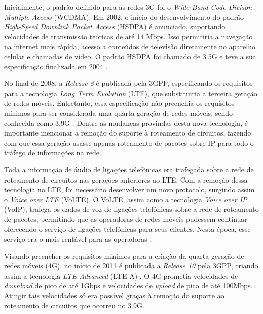 Inicialmente, o padrão definido para as redes 3G foi o \textit{Wide-Band Code-Divison Multiple Access} (WCDMA).
Em 2002, o início do desenvolvimento do padrão \textit{High-Speed Downlink Packet Access} (HSDPA) é anunciado, suportando velocidades de transmissão teóricas de até 14 Mbps. Isso permitiria a navegação na internet mais rápida, acesso a conteúdos de televisão diretamente no aparelho celular e chamadas de vídeo. O padrão HSDPA foi chamado de 3.5G e teve a sua especificação finalizada em 2004 \cite{Lamba2012}.

No final de 2008, a \textit{Release 8} é publicada pela 3GPP, especificando os requisitos para a tecnologia \textit{Long Term Evolution} (LTE), que substituiria a terceira geração de redes móveis.
Entretanto, essa especificação não preenchia os requisitos mínimos para ser considerada uma quarta geração de redes móveis, sendo conhecida como 3.9G \cite{delperal2018}.
Dentre as mudanças provindas desta nova tecnologia, é importante mencionar a remoção do suporte à roteamento de circuitos, fazendo com que essa geração usasse apenas roteamento de pacotes sobre IP para todo o tráfego de informações na rede.

Toda a informação de áudio de ligações telefônicas era trafegada sobre a rede de roteamento de circuitos nas gerações anteriores ao LTE.
Com a remoção dessa tecnologia no LTE, foi necessário desenvolver um novo protocolo, surgindo assim o \textit{Voice over LTE} (VoLTE).
O VoLTE, assim como a tecnologia \textit{Voice over IP} (VoIP), trafega os dados de voz de ligações telefônicas sobre a rede de roteamento de pacotes, permitindo que as operadoras de redes móveis pudessem continuar oferecendo o serviço de ligações telefônicas para seus clientes. Nesta época, esse serviço era o mais rentável para as operadoras \cite{Yi2012}. 

Visando preencher os requisitos mínimos para a criação da quarta geração de redes móveis (4G), no início de 2011 é publicada a \textit{Release 10} pela 3GPP, criando assim a tecnologia \textit{LTE-Advanced} (LTE-A) \cite{3gpp.21.201}.
O 4G prometia velocidades de \textit{download} de pico de até 1Gbps e velocidades de \textit{upload} de pico de até 100Mbps.
Atingir tais velocidades só era possível graças à remoção do suporte ao roteamento de circuitos que ocorreu no 3.9G.

